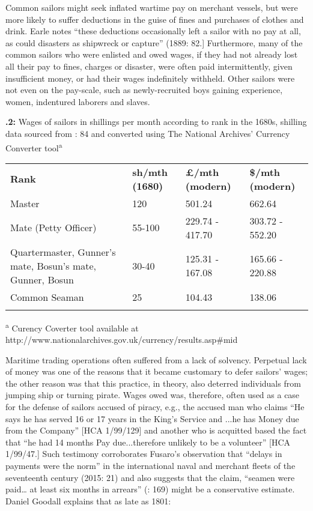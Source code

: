 Common sailors might seek inflated wartime pay on merchant vessels, but were more likely to suffer deductions in the guise of fines and purchases of clothes and drink. Earle notes “these deductions occasionally left a sailor with no pay at all, as could disasters as shipwreck or capture” (1889: 82.] Furthermore, many of the common sailors who were enlisted and owed wages, if they had not already lost all their pay to fines, charges or disaster, were often paid intermittently, given insufficient money, or had their wages indefinitely withheld. Other sailors were not even on the pay-scale, such as newly-recruited boys gaining experience, women, indentured laborers and slaves. 

\textbf{.2:} Wages of sailors in shillings per month according to rank in the 1680s, shilling data sourced from \citealt{Earle1998}: 84 and converted using The National Archives’ Currency Converter tool\textsuperscript{a}

\begin{tabularx}{\textwidth}{XXXX}
\lsptoprule

\textbf{Rank} & \textbf{sh/mth} \textbf{(1680)} & \textbf{£/mth} \textbf{(modern)} & \textbf{\$/mth} \textbf{(modern)}\\
Master & 120 & 501.24 & 662.64\\
Mate (Petty Officer) & 55-100 & 229.74 - 417.70 & 303.72 - 552.20\\
Quartermaster, Gunner’s mate, Bosun’s mate, Gunner, Bosun & 30-40 & 125.31 - 167.08 & 165.66 - 220.88\\
Common Seaman & 25 & 104.43 & 138.06\\
\lspbottomrule
\end{tabularx}
\textsuperscript{a} Curency Coverter tool available at http://www.nationalarchives.gov.uk/currency/results.asp\#mid

Maritime trading operations often suffered from a lack of solvency. Perpetual lack of money was one of the reasons that it became customary to defer sailors’ wages; the other reason was that this practice, in theory, also deterred individuals from jumping ship or turning pirate. Wages owed was, therefore, often used as a case for the defense of sailors accused of piracy, e.g., the accused man who claims “He says he has served 16 or 17 years in the King’s Service and ...he has Money due from the Company” [HCA 1/99/129] and another who is acquitted based the fact that “he had 14 months Pay due...therefore unlikely to be a volunteer” [HCA 1/99/47.] Such testimony corroborates Fusaro’s observation that “delays in payments were the norm” in the international naval and merchant fleets of the seventeenth century (2015: 21) and also suggests that the claim, “seamen were paid… at least six months in arrears” (\citealt{AdkinsAdkins2008}: 169) might be a conservative estimate. Daniel Goodall explains that as late as 1801:

